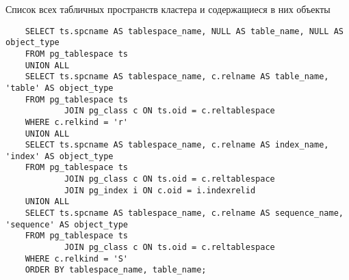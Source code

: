 \documentclass{article}
\begin{document}
Список всех табличных пространств кластера и содержащиеся в них объекты
\begin{verbatim}
    SELECT ts.spcname AS tablespace_name, NULL AS table_name, NULL AS object_type
    FROM pg_tablespace ts
    UNION ALL
    SELECT ts.spcname AS tablespace_name, c.relname AS table_name, 'table' AS object_type
    FROM pg_tablespace ts
            JOIN pg_class c ON ts.oid = c.reltablespace
    WHERE c.relkind = 'r'
    UNION ALL
    SELECT ts.spcname AS tablespace_name, c.relname AS index_name, 'index' AS object_type
    FROM pg_tablespace ts
            JOIN pg_class c ON ts.oid = c.reltablespace
            JOIN pg_index i ON c.oid = i.indexrelid
    UNION ALL
    SELECT ts.spcname AS tablespace_name, c.relname AS sequence_name, 'sequence' AS object_type
    FROM pg_tablespace ts
            JOIN pg_class c ON ts.oid = c.reltablespace
    WHERE c.relkind = 'S'
    ORDER BY tablespace_name, table_name;
\end{verbatim}
\end{document}
